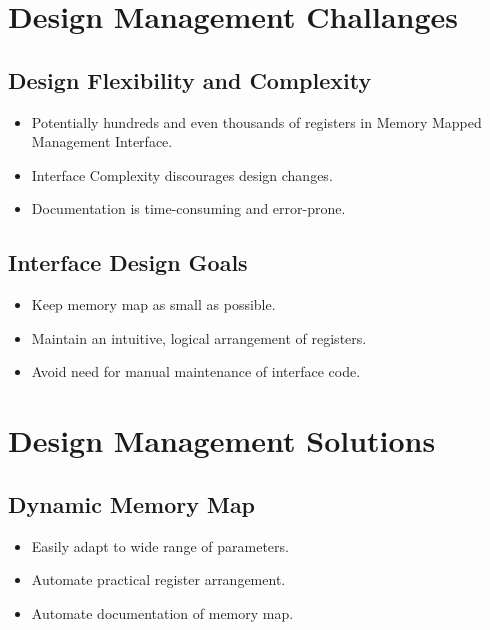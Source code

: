 \section{Design Management Challanges}

\subsection{Design Flexibility and Complexity}

\maketitle
\begin{itemize}
    \item  Potentially hundreds and even thousands of registers 
in Memory Mapped Management Interface.

\item Interface Complexity discourages design changes.
\item  Documentation is time-consuming and error-prone.

\end{itemize}

\subsection{Interface Design Goals}

\maketitle
\begin{itemize}
\item Keep memory map as small as possible.
\item  Maintain an intuitive, logical arrangement of registers.
\item  Avoid need for manual maintenance of interface code.

\end{itemize}

\section{Design Management Solutions}

\subsection{Dynamic Memory Map}

\maketitle
\begin{itemize}
    \item   Easily adapt to wide range of parameters.
\item  Automate practical register arrangement.
\item  Automate documentation of memory map.

\end{itemize}

